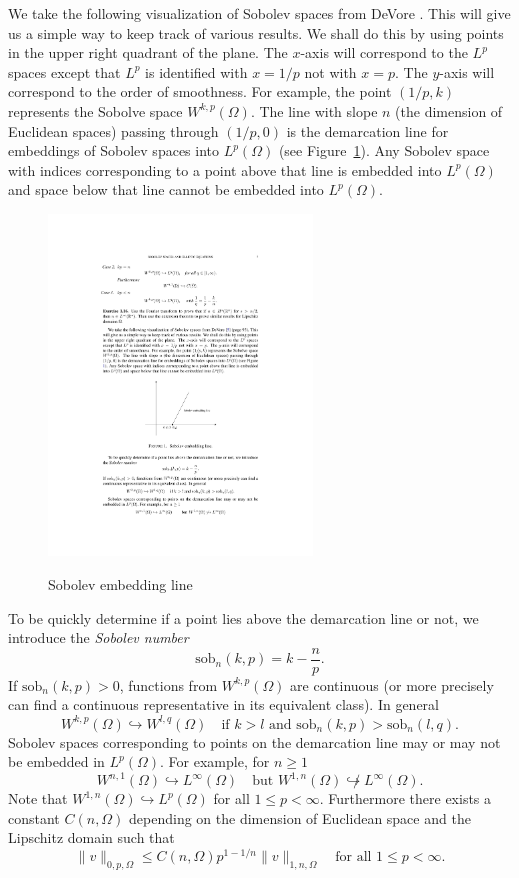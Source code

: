 We take the following visualization of Sobolev spaces from DeVore \cite[page 93]{DeVore1998}. This
will give us a simple way to keep track of various results. We shall do this by using points
in the upper right quadrant of the plane. The $x$-axis will correspond to the $L^p$ spaces
except that $L^p$ is identified with $x = 1/p$ not with $x = p$. The $y$-axis will correspond
to the order of smoothness. For example, the point $(1/p, k)$ represents the Sobolve space
$W^{k,p}(\Omega)$. The line with slope $n$ (the dimension of Euclidean spaces) passing through
$(1/p, 0)$ is the demarcation line for embeddings of Sobolev spaces into $L^p(\Omega)$ (see Figure~\ref{fig:sobolevEmbeddingLine}). Any Sobolev space with indices corresponding to a point above that line is embedded
into $L^p(\Omega)$ and space below that line cannot be embedded into $L^p(\Omega)$.
\begin{figure}[htbp]
  \centering
  \includegraphics[width=7cm]{figures/sobolevEmbeddingLine}\\
  \caption{Sobolev embedding line}\label{fig:sobolevEmbeddingLine}
\end{figure}

To be quickly determine if a point lies above the demarcation line or not, we introduce
the {\it Sobolev number}
\[
\textrm{sob}_n(k, p)=k-\frac{n}{p}.
\]
If $\textrm{sob}_n(k, p) > 0$, functions from $W^{k,p}(\Omega)$ are continuous (or more precisely can find a
continuous representative in its equivalent class). In general
\[
W^{k,p}(\Omega)\hookrightarrow W^{l,q}(\Omega)\quad\textrm{if } k>l \textrm{ and } \textrm{sob}_n(k, p)>\textrm{sob}_n(l, q).
\]
Sobolev spaces corresponding to points on the demarcation line may or may not be
embedded in $L^p(\Omega)$. For example, for $n\geq1$
\[
W^{n,1}(\Omega)\hookrightarrow L^{\infty}(\Omega)\quad \textrm{but } W^{1,n}(\Omega)\not\hookrightarrow L^{\infty}(\Omega).
\]
Note that $W^{1,n}(\Omega)\hookrightarrow L^{p}(\Omega)$ for all $1\leq p < \infty$. Furthermore there exists a constant
$C(n, \Omega)$ depending on the dimension of Euclidean space and the Lipschitz domain such
that
\begin{equation*}
\|v\|_{0,p,\Omega}\leq C(n, \Omega)p^{1-1/n} \|v\|_{1,n,\Omega}\quad\textrm{for all }1\leq p < \infty.
\end{equation*}

